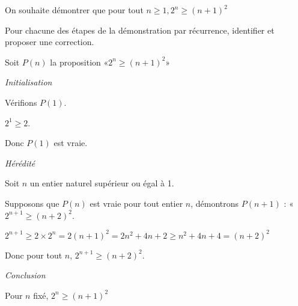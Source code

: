 \documentclass[varwidth,convert]{standalone}
\begin{document}
On souhaite démontrer que pour tout $n \geq 1, 2^n \geq (n+1)^2$

Pour chacune des étapes de la démonstration par récurrence, identifier
et proposer une correction.

Soit $P(n)$ la proposition «$2^n \geq (n+1)^2$»

\emph{Initialisation}

Vérifions $P(1)$.

$2^1 \geq 2$.

Donc $P(1)$ est vraie.

\emph{Hérédité}

Soit $n$ un entier naturel supérieur ou égal à 1.

Supposons que $P(n)$ est vraie pour tout entier $n$, démontrons $P(n+1)$
: « $2^{n+1} \geq (n+2)^2$.

$2^{n+1} \geq 2\times2^n = 2(n+1)^2 = 2n^2 + 4n + 2 \geq n^2 + 4n + 4 =
(n+2)^2$

Donc pour tout $n$, $2^{n+1} \geq (n+2)^2$.

\emph{Conclusion}

Pour $n$ fixé, $2^n \geq (n+1)^2$
\end{document}
